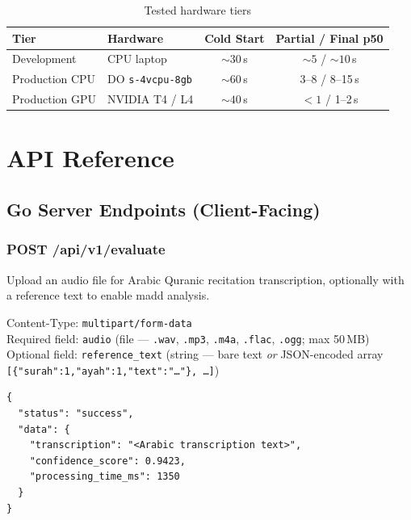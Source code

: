 \begin{table}[H]
  \centering
  \caption{Tested hardware tiers}
  \label{tab:hardware}
  \renewcommand{\arraystretch}{1.3}
  \begin{tabular}{llcc}
    \toprule
    \textbf{Tier} & \textbf{Hardware} & \textbf{Cold Start} & \textbf{Partial / Final p50} \\
    \midrule
    Development    & CPU laptop              & ${\sim}30$\,s & ${\sim}5$ / ${\sim}10$\,s \\
    Production CPU & DO \texttt{s-4vcpu-8gb} & ${\sim}60$\,s & 3--8 / 8--15\,s \\
    Production GPU & NVIDIA T4 / L4          & ${\sim}40$\,s & ${<}1$ / 1--2\,s \\
    \bottomrule
  \end{tabular}
\end{table}

\chapter{API Reference}

\section{Go Server Endpoints (Client-Facing)}

\subsection{POST /api/v1/evaluate}

Upload an audio file for Arabic Quranic recitation transcription, optionally with a reference text to enable madd analysis.

\begin{infobox}[title=Request Format]
Content-Type: \texttt{multipart/form-data}\\[2pt]
Required field: \texttt{audio} (file --- \texttt{.wav}, \texttt{.mp3}, \texttt{.m4a}, \texttt{.flac}, \texttt{.ogg}; max 50\,MB)\\[2pt]
Optional field: \texttt{reference\_text} (string --- bare text \emph{or} JSON-encoded array \texttt{[\{"surah":1,"ayah":1,"text":"\dots"\}, \dots]})
\end{infobox}

\begin{emeraldbox}[title=Success Response (200 OK) --- without reference\_text]
\begin{verbatim}
{
  "status": "success",
  "data": {
    "transcription": "<Arabic transcription text>",
    "confidence_score": 0.9423,
    "processing_time_ms": 1350
  }
}
\end{verbatim}
\end{emeraldbox}

